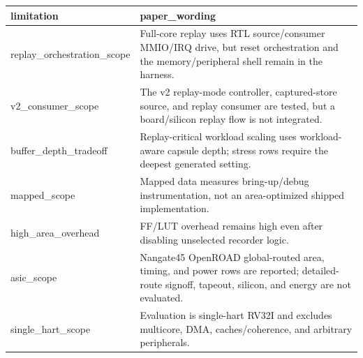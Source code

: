 \begin{tabular}{ll}
 \hline
limitation & paper\_wording \\
 \hline
replay\_orchestration\_scope & Full-core replay uses RTL source/consumer MMIO/IRQ drive, but reset orchestration and the memory/peripheral shell remain in the harness. \\
v2\_consumer\_scope & The v2 replay-mode controller, captured-store source, and replay consumer are tested, but a board/silicon replay flow is not integrated. \\
buffer\_depth\_tradeoff & Replay-critical workload scaling uses workload-aware capsule depth; stress rows require the deepest generated setting. \\
mapped\_scope & Mapped data measures bring-up/debug instrumentation, not an area-optimized shipped implementation. \\
high\_area\_overhead & FF/LUT overhead remains high even after disabling unselected recorder logic. \\
asic\_scope & Nangate45 OpenROAD global-routed area, timing, and power rows are reported; detailed-route signoff, tapeout, silicon, and energy are not evaluated. \\
single\_hart\_scope & Evaluation is single-hart RV32I and excludes multicore, DMA, caches/coherence, and arbitrary peripherals. \\
 \hline
\end{tabular}

